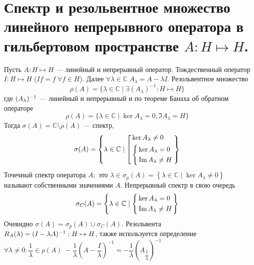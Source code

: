 \documentclass[14pt]{extarticle}
\begin{document}
\section*{Спектр и резольвентное множество линейного непрерывного оператора в гильбертовом пространстве $A : H \mapsto H$.}
Пусть $A : H \mapsto H$ --- линейный и непрерывный оператор.
Тождественный оператор $I : H \mapsto H$ ($If = f\;\forall f \in H$).
Далее $\forall \lambda \in \mathbb C\;A_\lambda = A - \lambda I$.
Резольвентное множество
$$
\rho(A) = \{ \lambda \in \mathbb C \mid \exists (A_\lambda)^{-1} : H \mapsto H \}
$$
где $(A_\lambda)^{-1}$ --- линейный и непрерывный и по теореме Банаха об обратном операторе
$$
\rho(A) = \{ \lambda \in \mathbb C \mid \ker A_\lambda = 0, \Im A_\lambda = H \}
$$
Тогда $\sigma(A) = \mathbb C \setminus \rho(A)$ --- спектр, 
$$
\sigma(A) = \left \{ \lambda \in \mathbb C \mid 
\left [
    \begin{aligned}
        &\ker A_\lambda \ne 0\\
        &\left \{
            \begin{aligned}
                &\ker A_\lambda = 0\\
                &\operatorname{Im} A_\lambda \ne H
            \end{aligned}
            \right.
    \end{aligned}
\right.\right\}
$$
Точечный спектр оператора $A;$ это $\lambda \in \sigma_p(A)= \left \{ \lambda \in \mathbb C \mid \ker A_\lambda \ne 0 \right\}$ называют собственными значениями $A$.
Непрерывный спектр в свою очередь 
$$\sigma_C(A) =  \left \{ \lambda \in \mathbb C \mid 
\left\{
    \begin{aligned}
                &\ker A_\lambda = 0\\
                &\operatorname{Im} A_\lambda \ne H
    \end{aligned}
\right.\right \}
$$
Очевидно $\sigma(A) = \sigma_p(A) \cup \sigma_C(A)$.
Резольвента $R_A(\lambda) = (I - \lambda A)^{-1} : H \mapsto H$, также используется определение
$\forall \lambda \ne 0\colon \dfrac{1}{\lambda} \in \rho(A)\;-\dfrac{1}{\lambda}(A - \dfrac{I}{\lambda})^{-1} = -\dfrac{1}{\lambda}(A_{\dfrac1{\lambda}})^{-1}$
\end{document}
